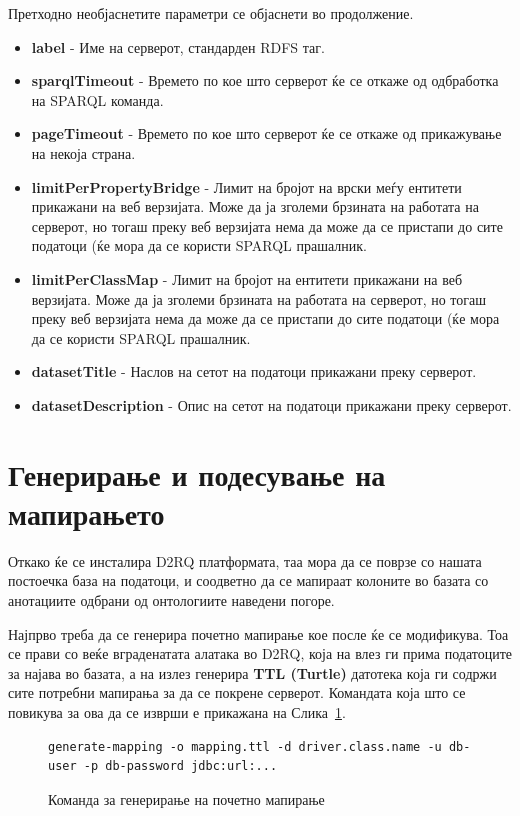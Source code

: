 \documentclass{uvamscse}
\begin{document}
Претходно необјаснетите параметри се објаснети во продолжение.

\begin{itemize}
\item \textbf{label} - Име на серверот, стандарден RDFS таг.
\item \textbf{sparqlTimeout} - Времето по кое што серверот ќе се откаже од одбработка на SPARQL команда.
\item \textbf{pageTimeout} - Времето по кое што серверот ќе се откаже од прикажување на некоја страна.
\item \textbf{limitPerPropertyBridge} - Лимит на бројот на врски меѓу ентитети прикажани на веб верзијата. Може да ја зголеми брзината на работата на серверот, но тогаш преку веб верзијата нема да може да се пристапи до сите податоци (ќе мора да се користи SPARQL прашалник.
\item \textbf{limitPerClassMap} - Лимит на бројот на ентитети прикажани на веб верзијата. Може да ја зголеми брзината на работата на серверот, но тогаш преку веб верзијата нема да може да се пристапи до сите податоци (ќе мора да се користи SPARQL прашалник.
\item \textbf{datasetTitle} - Наслов на сетот на податоци прикажани преку серверот.
\item \textbf{datasetDescription} - Опис на сетот на податоци прикажани преку серверот.

\end{itemize}



\section{Генерирање и подесување на мапирањето}

Откако ќе се инсталира D2RQ платформата, таа мора да се поврзе со нашата постоечка база на податоци, и соодветно да се мапираат колоните во базата со анотациите одбрани од онтологиите наведени погоре.
\vspace{5mm}

Најпрво треба да се генерира почетно мапирање кое после ќе се модификува. Тоа се прави со веќе вграденатата алатака во D2RQ, која на влез ги прима податоците за најава во базата, а на излез генерира \textbf{TTL (Turtle)} датотека која ги содржи сите потребни мапирања за да се покрене серверот. Командата која што се повикува за ова да се изврши е прикажана на Слика~\ref{fig:pocetnoMapiranje}.

\begin{figure}[H]
\centering
\begin{snippet}
\begin{verbatim}
generate-mapping -o mapping.ttl -d driver.class.name -u db-user -p db-password jdbc:url:...
\end{verbatim}
\end{snippet}
\caption{Команда за генерирање на почетно мапирање}
\label{fig:pocetnoMapiranje}
\end{figure}
\vspace{5mm}
\end{document}
